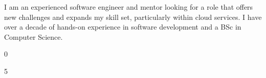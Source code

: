 \documentclass[8pt]{developercv} %
\begin{document}

\begin{minipage}[t]{0.4\textwidth} %
	\vspace{-\baselineskip} %
	\raggedright
	I am an experienced software engineer and mentor looking for a role that offers new challenges and expands my skill set, particularly within cloud services. I have over a decade of hands-on experience in software development and a BSc in Computer Science.
\end{minipage}
\hfill %
\begin{minipage}[t]{0.25\textwidth} %
	\vspace{-\baselineskip} %
	\begin{barchart}{0}
	\end{barchart}
\end{minipage}
\hfill %
\begin{minipage}[t]{0.3\textwidth} %
	\vspace{-\baselineskip} %
	\begin{barchart}{5}
	\end{barchart}
\end{minipage}



\end{document}
